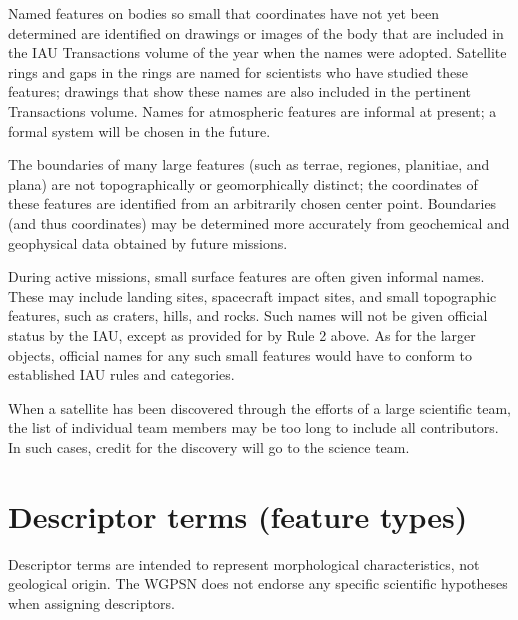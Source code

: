 Named features on bodies so small that coordinates have not yet been determined are identified on drawings or images 
of the body that are included in the IAU Transactions volume of the year when the names were adopted. 
Satellite rings and gaps in the rings are named for scientists who have studied these features; 
drawings that show these names are also included in the pertinent Transactions volume. 
Names for atmospheric features are informal at present; a formal system will be chosen in the future.

The boundaries of many large features (such as terrae, regiones, planitiae, and plana) are not topographically or geomorphically distinct; 
the coordinates of these features are identified from an arbitrarily chosen center point. 
Boundaries (and thus coordinates) may be determined more accurately from geochemical and geophysical data obtained by future missions.

During active missions, small surface features are often given informal names. 
These may include landing sites, spacecraft impact sites, and small topographic features, such as craters, hills, and rocks. 
Such names will not be given official status by the IAU, except as provided for by Rule 2 above. 
As for the larger objects, official names for any such small features would have to conform to established IAU rules and categories.

When a satellite has been discovered through the efforts of a large scientific team, 
the list of individual team members may be too long to include all contributors. 
In such cases, credit for the discovery will go to the science team.

\newpage
\section{Descriptor terms (feature types)}
\label{sec:Nomenclature:DescriptorTerms}
Descriptor terms are intended to represent morphological characteristics, not geological origin. 
The WGPSN does not endorse any specific scientific hypotheses when assigning descriptors.

